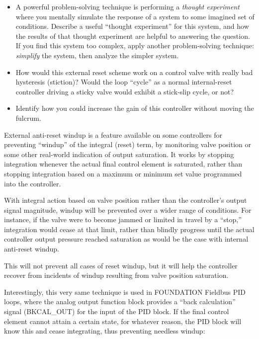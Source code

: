 \begin{itemize}
\item{} A powerful problem-solving technique is performing a {\it thought experiment} where you mentally simulate the response of a system to some imagined set of conditions.  Describe a useful ``thought experiment'' for this system, and how the results of that thought experiment are helpful to answering the question.  If you find this system too complex, apply another problem-solving technique: {\it simplify} the system, then analyze the simpler system.
\item{} How would this external reset scheme work on a control valve with really bad hysteresis (stiction)?  Would the loop ``cycle'' as a normal internal-reset controller driving a sticky valve would exhibit a stick-slip cycle, or not?
\item{} Identify how you could increase the gain of this controller without moving the fulcrum.
\end{itemize}







External anti-reset windup is a feature available on some controllers for preventing ``windup'' of the integral (reset) term, by monitoring valve position or some other real-world indication of output saturation.  It works by stopping integration whenever the actual final control element is saturated, rather than stopping integration based on a maximum or minimum set value programmed into the controller.

\vskip 10pt

With integral action based on valve position rather than the controller's output signal magnitude, windup will be prevented over a wider range of conditions.  For instance, if the valve were to become jammed or limited in travel by a ``stop,'' integration would cease at that limit, rather than blindly progress until the actual controller output pressure reached saturation as would be the case with internal anti-reset windup.

This will not prevent all cases of reset windup, but it will help the controller recover from incidents of windup resulting from valve position saturation.

\vskip 10pt

Interestingly, this very same technique is used in FOUNDATION Fieldbus PID loops, where the analog output function block provides a ``back calculation'' signal (BKCAL\_OUT) for the input of the PID block.  If the final control element cannot attain a certain state, for whatever reason, the PID block will know this and cease integrating, thus preventing needless windup:

